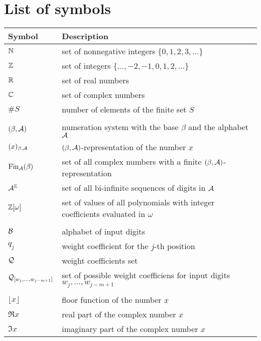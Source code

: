 \chapter*{List of symbols}
\begin{tabular}{ll}
Symbol        & Description \\ \hline
$\mathbb{N}$         & set of nonnegative integers $\{0,1,2,3,\dots\}$   \\
$\mathbb{Z}$         & set of integers $\{\dots,-2,-1,0,1,2,\dots\}$ \\
$\mathbb{R}$           & set of real numbers \\
$\mathbb{C}$           & set of complex numbers \\
$\#S$          & number of elements of the finite set $S$ \\
\rule{0cm}{0cm}& \\
$(\beta,\mathcal{A})$            & numeration system with the base $\beta$ and the alphabet $\mathcal{A}$\\
$(x)_{\beta,\mathcal{A}}$    &$(\beta,\mathcal{A})$-representation of the number $x$\\
$\text{Fin}_{\mathcal{A}}(\beta)$          &set of all complex numbers with a finite $(\beta,\mathcal{A})$-representation \\
$\mathcal{A}^{\mathbb{Z}}$        &set of all bi-infinite sequences of digits in $\mathcal{A}$\\
$\mathbb{Z}[\omega]$       &set of values of all polynomials with integer coefficients evaluated in $\omega$\\
\rule{0cm}{0cm}& \\
$\mathcal{B}$            &alphabet of input digits\\
$q_j$           &weight coefficient for the $j$-th position \\
$\mathcal{Q}$            &weight coefficients set\\
$\mathcal{Q}_{[w_{j},\dots, w_{j-m+1}]}$ &set of possible weight coefficiens for input digits $w_{j},\dots, w_{j-m+1}$ \\
\rule{0cm}{0cm}& \\
$\lfloor x \rfloor$ & floor function of the number $x$ \\  
$\Re x$           & real part of the complex number $x$ \\
$\Im x$           & imaginary part of the complex number $x$
\end{tabular}